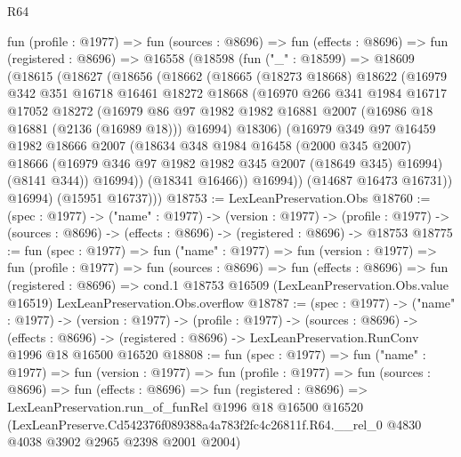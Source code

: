 \begin{lexlean}{R64}
\begin{coremodule}
  fun (profile : @1977) =>
  fun (sources : @8696) =>
  fun (effects : @8696) =>
  fun (registered : @8696) =>
  @16558
    (@18598
      (fun ("_" : @18599) =>
      @18609
        (@18615
          (@18627
            (@18656
              (@18662
                (@18665
                  (@18273 @18668)
                  @18622
                  (@16979
                    @342
                    @351
                    @16718
                    @16461
                    @18272
                    @18668
                    (@16970
                      @266
                      @341
                      @1984
                      @16717
                      @17052
                      @18272
                      (@16979
                        @86
                        @97
                        @1982
                        @1982
                        @16881
                        @2007
                        (@16986 @18 @16881 (@2136 (@16989 @18)))
                        @16994)
                      @18306)
                    (@16979
                      @349
                      @97
                      @16459
                      @1982
                      @18666
                      @2007
                      (@18634
                        @348
                        @1984
                        @16458
                        (@2000 @345 @2007)
                        @18666
                        (@16979 @346 @97 @1982 @1982 @345 @2007 (@18649 @345) @16994)
                        (@8141 @344))
                      @16994))
                  (@18341 @16466))
                @16994))
            (@14687 @16473 @16731))
          @16994)
        (@15951 @16737)))
@18753 := LexLeanPreservation.Obs
@18760 := (spec : @1977) ->
  ("name" : @1977) ->
  (version : @1977) ->
  (profile : @1977) -> (sources : @8696) -> (effects : @8696) -> (registered : @8696) -> @18753
@18775 := fun (spec : @1977) =>
  fun ("name" : @1977) =>
  fun (version : @1977) =>
  fun (profile : @1977) =>
  fun (sources : @8696) =>
  fun (effects : @8696) =>
  fun (registered : @8696) =>
  cond.{1} @18753 @16509 (LexLeanPreservation.Obs.value @16519) LexLeanPreservation.Obs.overflow
@18787 := (spec : @1977) ->
  ("name" : @1977) ->
  (version : @1977) ->
  (profile : @1977) ->
  (sources : @8696) ->
  (effects : @8696) -> (registered : @8696) -> LexLeanPreservation.RunConv @1996 @18 @16500 @16520
@18808 := fun (spec : @1977) =>
  fun ("name" : @1977) =>
  fun (version : @1977) =>
  fun (profile : @1977) =>
  fun (sources : @8696) =>
  fun (effects : @8696) =>
  fun (registered : @8696) =>
  LexLeanPreservation.run_of_funRel
    @1996
    @18
    @16500
    @16520
    (LexLeanPreserve.Cd542376f089388a4a783f2fc4c26811f.R64.__rel_0
      @4830
      @4038
      @3902
      @2965
      @2398
      @2001
      @2004)
\end{coremodule}
\end{lexlean}
